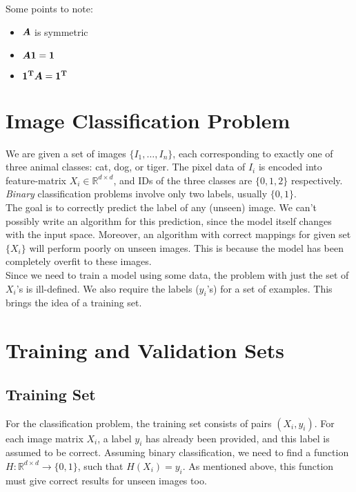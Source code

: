 \documentclass[12pt]{article}
\begin{document}
\noindent Some points to note:
\begin{itemize}
	\itemsep0em
	\item ${\boldsymbol A}$ is symmetric
	\item ${\boldsymbol A}{\bf 1} = {\bf 1}$
	\item ${\bf 1^T}{\boldsymbol A} = {\bf 1^T}$
\end{itemize}


\section{Image Classification Problem}

We are given a set of images $\{I_1, \dots, I_n\}$, each corresponding to exactly one of three animal classes: cat, dog, or tiger. The pixel data of $I_i$ is encoded into feature-matrix $X_i \in \mathbb{R}^{d\times d}$, and IDs of the three classes are $\{0,1,2\}$ respectively. \textit{Binary} classification problems involve only two labels, usually $\{0,1\}$.
\\

\noindent The goal is to correctly predict the label of any (unseen) image. We can't possibly write an algorithm for this prediction, since the model itself changes with the input space. Moreover, an algorithm with correct mappings for given set $\{X_i\}$ will perform poorly on unseen images. This is because the model has been completely overfit to these images.
\\

\noindent Since we need to train a model using some data, the problem with just the set of $X_i$'s is ill-defined. We also require the labels ($y_i$'s) for a set of examples. This brings the idea of a training set.

\section{Training and Validation Sets}


\subsection{Training Set}
For the classification problem, the training set consists of pairs $(X_i,y_i)$. For each image matrix $X_i$, a label $y_i$ has already been provided, and this label is assumed to be correct. Assuming binary classification, we need to find a function $H : \mathbb{R}^{d\times d} \to \{0,1\}$, such that $H(X_i)=y_i$. As mentioned above, this function must give correct results for unseen images too.
\end{document}
